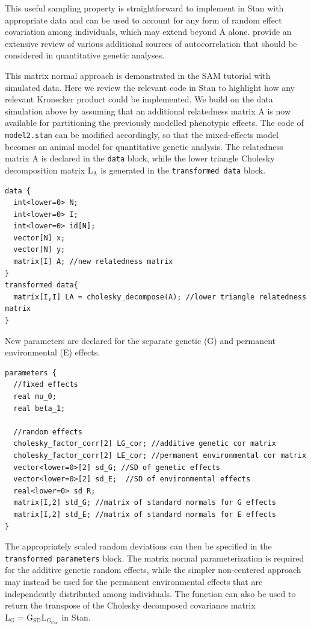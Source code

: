 \documentclass[
]{book}
\begin{document}
This useful sampling property is straightforward to implement in Stan with appropriate data and can be used to account for any form of random effect covariation among individuals, which may extend beyond \(\boldsymbol{\mathrm{A}}\) alone. \citet{Thomson2018} provide an extensive review of various additional sources of autocorrelation that should be considered in quantitative genetic analyses.

This matrix normal approach is demonstrated in the SAM tutorial with simulated data. Here we review the relevant code in Stan to highlight how any relevant Kronecker product could be implemented. We build on the data simulation above by assuming that an additional relatedness matrix \(\boldsymbol{{\mathrm{A}}}\) is now available for partitioning the previously modelled phenotypic effects. The code of \texttt{model2.stan} can be modified accordingly, so that the mixed-effects model becomes an animal model for quantitative genetic analysis. The relatedness matrix \(\boldsymbol{{\mathrm{A}}}\) is declared in the \texttt{data} block, while the lower triangle Cholesky decomposition matrix \(\boldsymbol{\mathrm{L_A}}\) is generated in the \texttt{transformed\ data} block.

\begin{verbatim}
data {
  int<lower=0> N; 
  int<lower=0> I; 
  int<lower=0> id[N]; 
  vector[N] x; 
  vector[N] y;
  matrix[I] A; //new relatedness matrix
}
transformed data{
  matrix[I,I] LA = cholesky_decompose(A); //lower triangle relatedness matrix 
}
\end{verbatim}

New parameters are declared for the separate genetic (G) and permanent environmental (E) effects.

\begin{verbatim}
parameters {
  //fixed effects
  real mu_0;
  real beta_1;
  
  //random effects
  cholesky_factor_corr[2] LG_cor; //additive genetic cor matrix
  cholesky_factor_corr[2] LE_cor; //permanent environmental cor matrix
  vector<lower=0>[2] sd_G; //SD of genetic effects
  vector<lower=0>[2] sd_E;  //SD of environmental effects
  real<lower=0> sd_R;
  matrix[I,2] std_G; //matrix of standard normals for G effects
  matrix[I,2] std_E; //matrix of standard normals for E effects
}
\end{verbatim}

The appropriately scaled random deviations can then be specified in the \texttt{transformed\ parameters} block. The matrix normal parameterization is required for the additive genetic random effects, while the simpler non-centered approach may instead be used for the permanent environmental effects that are independently distributed among individuals. The \texttt{\textquotesingle{}} function can also be used to return the transpose of the Cholesky decomposed covariance matrix \(\boldsymbol{\mathrm{L_G}}=\boldsymbol{\mathrm{G_{SD}}}\boldsymbol{\mathrm{L_{G_{Cor}}}}\) in Stan.
\end{document}
